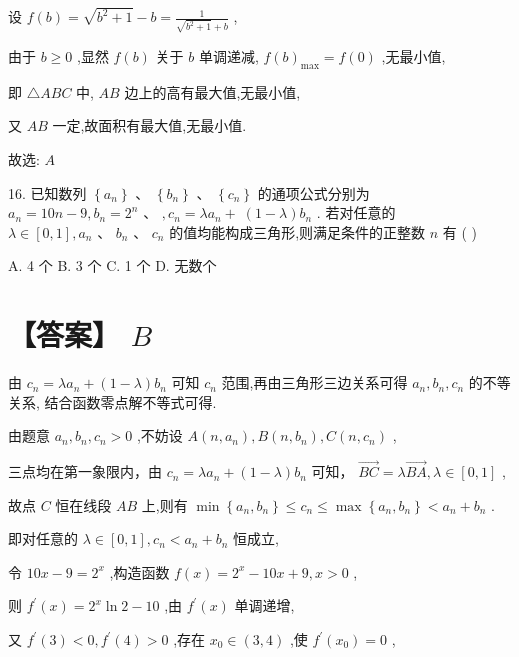 \documentclass[10pt]{article}
\begin{document}
设 \(f\left( b\right)  = \sqrt{{b}^{2} + 1} - b = \frac{1}{\sqrt{{b}^{2} + 1} + b}\) ,

由于 \(b \geq  0\) ,显然 \(f\left( b\right)\) 关于 \(b\) 单调递减, \(f{\left( b\right) }_{\max } = f\left( 0\right)\) ,无最小值,

即 \(\bigtriangleup {ABC}\) 中, \({AB}\) 边上的高有最大值,无最小值,

又 \({AB}\) 一定,故面积有最大值,无最小值.

故选: \(A\)

16. 已知数列 \(\left\{  {a}_{n}\right\}  \text{ 、 }\left\{  {b}_{n}\right\}  \text{ 、 }\left\{  {c}_{n}\right\}\) 的通项公式分别为 \({a}_{n} = {10n} - 9,{b}_{n} = {2}^{n}\text{ 、 },{c}_{n} = \lambda {a}_{n} + \; \left( {1 - \lambda }\right) {b}_{n}\) . 若对任意的 \(\lambda  \in  \left\lbrack  {0,1}\right\rbrack  ,{a}_{n}\text{ 、 }{b}_{n}\text{ 、 }{c}_{n}\) 的值均能构成三角形,则满足条件的正整数 \(n\) 有 ( )

A. 4 个 B. 3 个 C. 1 个 D. 无数个

\section*{【答案】 \(B\)}

由 \({c}_{n} = \lambda {a}_{n} + \left( {1 - \lambda }\right) {b}_{n}\) 可知 \({c}_{n}\) 范围,再由三角形三边关系可得 \({a}_{n},{b}_{n},{c}_{n}\) 的不等关系, 结合函数零点解不等式可得.

由题意 \({a}_{n},{b}_{n},{c}_{n} > 0\) ,不妨设 \(A\left( {n,{a}_{n}}\right) ,B\left( {n,{b}_{n}}\right) ,C\left( {n,{c}_{n}}\right)\) ,

三点均在第一象限内，由 \({c}_{n} = \lambda {a}_{n} + \left( {1 - \lambda }\right) {b}_{n}\) 可知， \(\overrightarrow{BC} = \lambda \overrightarrow{BA},\lambda  \in  \left\lbrack  {0,1}\right\rbrack\) ,

故点 \(C\) 恒在线段 \({AB}\) 上,则有 \(\min \left\{  {{a}_{n},{b}_{n}}\right\}   \leq  {c}_{n} \leq  \max \left\{  {{a}_{n},{b}_{n}}\right\}   < {a}_{n} + {b}_{n}\) .

即对任意的 \(\lambda  \in  \left\lbrack  {0,1}\right\rbrack  ,{c}_{n} < {a}_{n} + {b}_{n}\) 恒成立,

令 \({10x} - 9 = {2}^{x}\) ,构造函数 \(f\left( x\right)  = {2}^{x} - {10x} + 9,x > 0\) ,

则 \({f}^{\prime }\left( x\right)  = {2}^{x}\ln 2 - {10}\) ,由 \({f}^{\prime }\left( x\right)\) 单调递增,

又 \({f}^{\prime }\left( 3\right)  < 0,{f}^{\prime }\left( 4\right)  > 0\) ,存在 \({x}_{0} \in  \left( {3,4}\right)\) ,使 \({f}^{\prime }\left( {x}_{0}\right)  = 0\) ,
\end{document}
